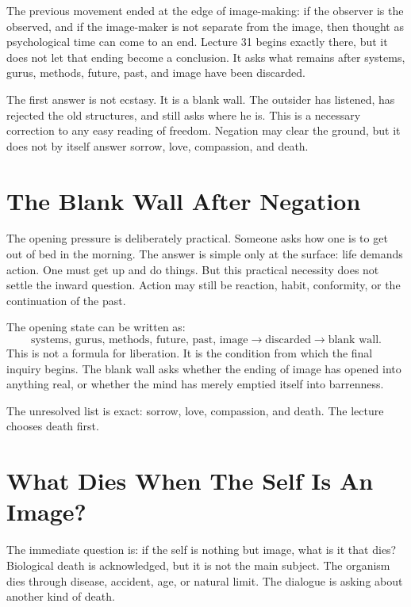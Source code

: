 \documentclass[11pt,oneside]{book}
\begin{document}
The previous movement ended at the edge of image-making: if the observer is the observed, and if the image-maker is not separate from the image, then thought as psychological time can come to an end. Lecture 31 begins exactly there, but it does not let that ending become a conclusion. It asks what remains after systems, gurus, methods, future, past, and image have been discarded.

The first answer is not ecstasy. It is a blank wall. The outsider has listened, has rejected the old structures, and still asks where he is. This is a necessary correction to any easy reading of freedom. Negation may clear the ground, but it does not by itself answer sorrow, love, compassion, and death.

\section{The Blank Wall After Negation}

The opening pressure is deliberately practical. Someone asks how one is to get out of bed in the morning. The answer is simple only at the surface: life demands action. One must get up and do things. But this practical necessity does not settle the inward question. Action may still be reaction, habit, conformity, or the continuation of the past.

The opening state can be written as:
\begin{equation}
\text{systems, gurus, methods, future, past, image}
\longrightarrow
\text{discarded}
\longrightarrow
\text{blank wall}.
\end{equation}
This is not a formula for liberation. It is the condition from which the final inquiry begins. The blank wall asks whether the ending of image has opened into anything real, or whether the mind has merely emptied itself into barrenness.

The unresolved list is exact: sorrow, love, compassion, and death. The lecture chooses death first.

\section{What Dies When The Self Is An Image?}

The immediate question is: if the self is nothing but image, what is it that dies? Biological death is acknowledged, but it is not the main subject. The organism dies through disease, accident, age, or natural limit. The dialogue is asking about another kind of death.
\end{document}
